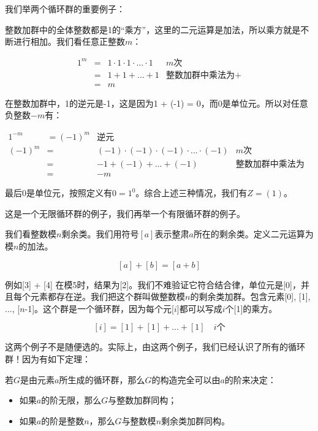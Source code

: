 \documentclass{article}
\begin{document}
我们举两个循环群的重要例子：

\begin{example}
整数加群中的全体整数都是1的“乘方”，这里的二元运算是加法，所以乘方就是不断进行相加。我们看任意正整数$m$：

\[
\begin{array}{rcll}
1^m & = & 1 \cdot 1 \cdot 1 \cdot ... \cdot 1 & \text{$m$次} \\
    & = & 1 + 1 + ... + 1 & \text{整数加群中乘法为+} \\
    & = & m &
\end{array}
\]

在整数加群中，1的逆元是-1，这是因为1 + (-1) = 0，而0是单位元。所以对任意负整数$-m$有：

\[
\begin{array}{rcll}
1^{-m} & = (-1)^m & \text{逆元} & \\
(-1)^m & = & (-1) \cdot (-1) \cdot (-1) \cdot ... \cdot (-1) & \text{$m$次} \\
       & = & -1 + (-1) + ... + (-1) & \text{整数加群中乘法为+} \\
       & = & -m &
\end{array}
\]

最后0是单位元，按照定义有$0 = 1^0$。综合上述三种情况，我们有$Z = (1)$。
\end{example}

这是一个无限循环群的例子，我们再举一个有限循环群的例子。

\begin{example}
我们看整数模$n$剩余类。我们用符号$[a]$表示整肃$a$所在的剩余类。定义二元运算为模$n$的加法。

\[
[a] + [b] = [a + b]
\]

例如[3] + [4] 在模5时，结果为[2]。我们不难验证它符合结合律，单位元是[0]，并且每个元素都存在逆。我们把这个群叫做整数模$n$的剩余类加群。包含元素[0], [1], ..., [$n$-1]。这个群是一个循环群，因为每个元[$i$]都可以写成$i$个[1]的乘方。

\[
[i] = [1] + [1] + ... + [1] \quad \text{$i$个}
\]
\end{example}

这两个例子不是随便选的。实际上，由这两个例子，我们已经认识了所有的循环群！因为有如下定理：

\begin{theorem}
若$G$是由元素$a$所生成的循环群，那么$G$的构造完全可以由$a$的阶来决定：
\begin{itemize}
\item 如果$a$的阶无限，那么$G$与整数加群同构；
\item 如果$a$的阶是整数$n$，那么$G$与整数模$n$剩余类加群同构。
\end{itemize}
\end{theorem}
\end{document}
